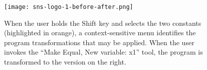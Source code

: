 \begin{figure}[h]
\centering
%
\texttt{[image: sns-logo-1-before-after.png]}
%
\caption{When the user holds the Shift key and selects the two constants
(highlighted in orange), a context-sensitive menu identifies the program
transformations that may be applied. When the user invokes the ``Make
Equal, New variable: x1'' tool, the program is transformed to the
version on the right.}
\label{fig:overview-1}
\end{figure}
